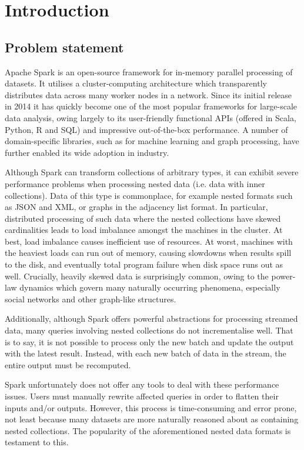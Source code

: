 \chapter{Introduction}

\section{Problem statement} {

Apache Spark \cite{spark} is an open-source framework for in-memory parallel processing of datasets. It utilises a cluster-computing architecture which transparently distributes data across many worker nodes in a network. Since its initial release in 2014 it has quickly become one of the most popular frameworks for large-scale data analysis, owing largely to its user-friendly functional APIs (offered in Scala, Python, R and SQL) and impressive out-of-the-box performance. A number of domain-specific libraries, such as for machine learning and graph processing, have further enabled its wide adoption in industry.

Although Spark can transform collections of arbitrary types, it can exhibit severe performance problems when processing nested data (i.e. data with inner collections). Data of this type is commonplace, for example nested formats such as JSON and XML, or graphs in the adjacency list format. In particular, distributed processing of such data where the nested collections have skewed cardinalities leads to load imbalance amongst the machines in the cluster. At best, load imbalance causes inefficient use of resources. At worst, machines with the heaviest loads can run out of memory, causing slowdowns when results spill to the disk, and eventually total program failure when disk space runs out as well. Crucially, heavily skewed data is surprisingly common, owing to the power-law dynamics which govern many naturally occurring phenomena, especially social networks and other graph-like structures.

Additionally, although Spark offers powerful abstractions for processing streamed data, many queries involving nested collections do not incrementalise well. That is to say, it is not possible to process only the new batch and update the output with the latest result. Instead, with each new batch of data in the stream, the entire output must be recomputed.

Spark unfortunately does not offer any tools to deal with these performance issues. Users must manually rewrite affected queries in order to flatten their inputs and/or outputs. However, this process is time-consuming and error prone, not least because many datasets are more naturally reasoned about as containing nested collections. The popularity of the aforementioned nested data formats is testament to this.

}

